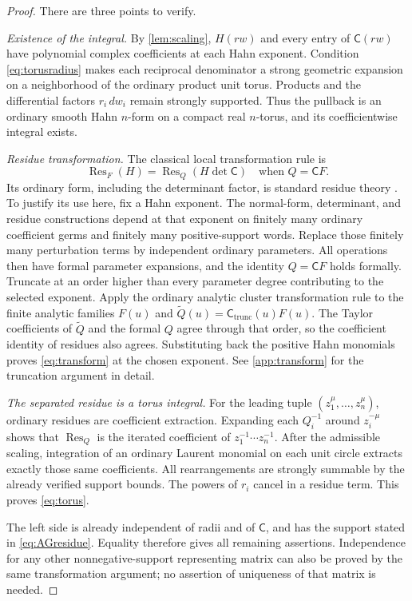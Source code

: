 \documentclass[11pt,letterpaper]{article}
\theoremstyle{definition}
\theoremstyle{remark}
\newcommand{\Res}{\operatorname{Res}}
\numberwithin{equation}{section}
\begin{document}
\begin{proof}
There are three points to verify.

\emph{Existence of the integral.} By \cref{lem:scaling}, $H(rw)$ and every entry of $\mathsf C(rw)$ have polynomial complex coefficients at each Hahn exponent. Condition \eqref{eq:torusradius} makes each reciprocal denominator a strong geometric expansion on a neighborhood of the ordinary product unit torus. Products and the differential factors $r_i\,dw_i$ remain strongly supported. Thus the pullback is an ordinary smooth Hahn $n$-form on a compact real $n$-torus, and its coefficientwise integral exists.

\emph{Residue transformation.} The classical local transformation rule is
\begin{equation}\label{eq:transform}
\Res_F(H)=\Res_Q(H\det\mathsf C)
\quad\text{when }Q=\mathsf C F.
\end{equation}
Its ordinary form, including the determinant factor, is standard residue theory \cite[\S0, equation (0.6)]{CDS}. To justify its use here, fix a Hahn exponent. The normal-form, determinant, and residue constructions depend at that exponent on finitely many ordinary coefficient germs and finitely many positive-support words. Replace those finitely many perturbation terms by independent ordinary parameters. All operations then have formal parameter expansions, and the identity $Q=\mathsf C F$ holds formally. Truncate at an order higher than every parameter degree contributing to the selected exponent. Apply the ordinary analytic cluster transformation rule to the finite analytic families $F(u)$ and $\widetilde Q(u)=\mathsf C_{\mathrm{trunc}}(u)F(u)$. The Taylor coefficients of $\widetilde Q$ and the formal $Q$ agree through that order, so the coefficient identity of residues also agrees. Substituting back the positive Hahn monomials proves \eqref{eq:transform} at the chosen exponent. See \cref{app:transform} for the truncation argument in detail.

\emph{The separated residue is a torus integral.} For the leading tuple $(z_1^\mu,\ldots,z_n^\mu)$, ordinary residues are coefficient extraction. Expanding each $Q_i^{-1}$ around $z_i^{-\mu}$ shows that $\Res_Q$ is the iterated coefficient of $z_1^{-1}\cdots z_n^{-1}$. After the admissible scaling, integration of an ordinary Laurent monomial on each unit circle extracts exactly those same coefficients. All rearrangements are strongly summable by the already verified support bounds. The powers of $r_i$ cancel in a residue term. This proves \eqref{eq:torus}.

The left side is already independent of radii and of $\mathsf C$, and has the support stated in \eqref{eq:AGresidue}. Equality therefore gives all remaining assertions. Independence for any other nonnegative-support representing matrix can also be proved by the same transformation argument; no assertion of uniqueness of that matrix is needed.
\end{proof}
\end{document}
